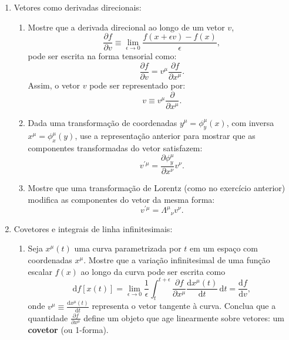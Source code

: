 \begin{enumerate}
      \item Vetores como derivadas direcionais:
            \begin{enumerate}
                  \item Mostre que a derivada direcional ao longo de um vetor $v$,
                        $$
                              \frac{\partial f}{\partial v} \equiv \lim_{\epsilon \to 0}
                              \frac{f(x + \epsilon v) - f(x)}{\epsilon},
                        $$
                        pode ser escrita na forma tensorial como:
                        $$
                              \frac{\partial f}{\partial v} = v^\mu \frac{\partial f}{\partial x^\mu}.
                        $$
                        Assim, o vetor $v$ pode ser representado por:
                        $$
                              v \equiv v^\mu \frac{\partial }{\partial x^\mu}.
                        $$

                  \item Dada uma transformação de coordenadas $y^\mu = \phi_y^\mu(x)$,
                        com inversa $x^\mu = \phi_x^\mu(y)$, use a representação anterior para
                        mostrar que as componentes transformadas do vetor satisfazem:
                        $$
                              v^{\prime\mu} = \frac{\partial \phi_y^\mu}{\partial x^\nu} v^\nu.
                        $$

                  \item Mostre que uma transformação de Lorentz (como no exercício
                        anterior) modifica as componentes do vetor da mesma forma:
                        $$
                              v^{\prime\mu} = \Lambda^\mu{}_\nu v^\nu.
                        $$
            \end{enumerate}

      \item Covetores e integrais de linha infinitesimais:
            \begin{enumerate}
                  \item Seja $x^\mu(t)$ uma curva parametrizada por $t$ em um espaço com
                        coordenadas $x^\mu$. Mostre que a variação infinitesimal de uma
                        função escalar $f(x)$ ao longo da curva pode ser escrita como
                        $$
                              \mathrm{d}f[x(t)] = \lim_{\epsilon \to 0} \frac{1}{\epsilon} \int_t^{t+\epsilon} \frac{\partial f}{\partial x^\mu} \frac{\mathrm{d}x^\mu(t)}{\mathrm{d}t} \,\mathrm{d}t = \frac{\mathrm{d}f}{\mathrm{d}v},
                        $$
                        onde $v^\mu \equiv \frac{\mathrm{d}x^\mu(t)}{\mathrm{d}t}$
                        representa o vetor tangente à curva. Conclua que a quantidade
                        $\frac{\partial f}{\partial x^\mu}$ define um objeto que age
                        linearmente sobre vetores: um \textbf{covetor} (ou 1-forma).


\end{enumerate}
\end{enumerate}
